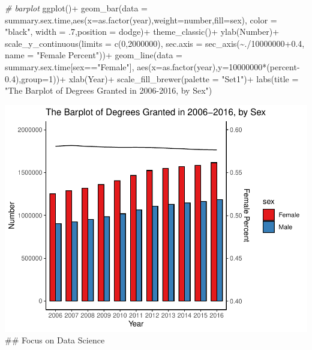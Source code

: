 \documentclass[
  12pt,
]{article}
\newenvironment{Shaded}{\begin{snugshade}}{\end{snugshade}}
\newcommand{\AttributeTok}[1]{\textcolor[rgb]{0.77,0.63,0.00}{#1}}
\newcommand{\CommentTok}[1]{\textcolor[rgb]{0.56,0.35,0.01}{\textit{#1}}}
\newcommand{\DecValTok}[1]{\textcolor[rgb]{0.00,0.00,0.81}{#1}}
\newcommand{\FloatTok}[1]{\textcolor[rgb]{0.00,0.00,0.81}{#1}}
\newcommand{\FunctionTok}[1]{\textcolor[rgb]{0.00,0.00,0.00}{#1}}
\newcommand{\NormalTok}[1]{#1}
\newcommand{\SpecialCharTok}[1]{\textcolor[rgb]{0.00,0.00,0.00}{#1}}
\newcommand{\StringTok}[1]{\textcolor[rgb]{0.31,0.60,0.02}{#1}}
\begin{document}
\begin{Shaded}
\begin{Highlighting}[]
\CommentTok{\# barplot}
\FunctionTok{ggplot}\NormalTok{()}\SpecialCharTok{+}
  \FunctionTok{geom\_bar}\NormalTok{(}\AttributeTok{data =}\NormalTok{ summary.sex.time,}\FunctionTok{aes}\NormalTok{(}\AttributeTok{x=}\FunctionTok{as.factor}\NormalTok{(year),}\AttributeTok{weight=}\NormalTok{number,}\AttributeTok{fill=}\NormalTok{sex),}
           \AttributeTok{color =} \StringTok{"black"}\NormalTok{, }\AttributeTok{width =}\NormalTok{ .}\DecValTok{7}\NormalTok{,}\AttributeTok{position =} \StringTok{\textquotesingle{}dodge\textquotesingle{}}\NormalTok{)}\SpecialCharTok{+}
  \FunctionTok{theme\_classic}\NormalTok{()}\SpecialCharTok{+}
  \FunctionTok{ylab}\NormalTok{(}\StringTok{\textquotesingle{}Number\textquotesingle{}}\NormalTok{)}\SpecialCharTok{+}
  \FunctionTok{scale\_y\_continuous}\NormalTok{(}\AttributeTok{limits =} \FunctionTok{c}\NormalTok{(}\DecValTok{0}\NormalTok{,}\DecValTok{2000000}\NormalTok{),}
                     \AttributeTok{sec.axis =} \FunctionTok{sec\_axis}\NormalTok{(}\SpecialCharTok{\textasciitilde{}}\NormalTok{.}\SpecialCharTok{/}\DecValTok{10000000}\FloatTok{+0.4}\NormalTok{, }\AttributeTok{name =} \StringTok{"Female Percent"}\NormalTok{))}\SpecialCharTok{+}
  \FunctionTok{geom\_line}\NormalTok{(}\AttributeTok{data =}\NormalTok{ summary.sex.time[sex}\SpecialCharTok{==}\StringTok{"Female"}\NormalTok{],}
            \FunctionTok{aes}\NormalTok{(}\AttributeTok{x=}\FunctionTok{as.factor}\NormalTok{(year),}\AttributeTok{y=}\DecValTok{10000000}\SpecialCharTok{*}\NormalTok{(percent}\FloatTok{{-}0.4}\NormalTok{),}\AttributeTok{group=}\DecValTok{1}\NormalTok{))}\SpecialCharTok{+}
  \FunctionTok{xlab}\NormalTok{(}\StringTok{\textquotesingle{}Year\textquotesingle{}}\NormalTok{)}\SpecialCharTok{+}
  \FunctionTok{scale\_fill\_brewer}\NormalTok{(}\AttributeTok{palette =} \StringTok{"Set1"}\NormalTok{)}\SpecialCharTok{+}
  \FunctionTok{labs}\NormalTok{(}\AttributeTok{title =} \StringTok{"The Barplot of Degrees Granted in 2006{-}2016, by Sex"}\NormalTok{)}
\end{Highlighting}
\end{Shaded}

\includegraphics{hw1_sol_files/figure-latex/unnamed-chunk-10-1.pdf} \#\#
Focus on Data Science
\end{document}
